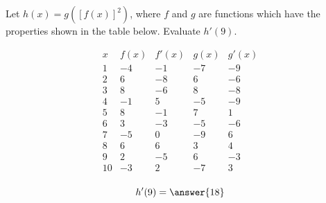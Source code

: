 \documentclass{ximera}
\author{Steven Gubkin}
\begin{document}
\begin{exercise}

Let $h(x) = g(\left[f(x)\right]^2)$, where $f$ and $g$ are functions which have the properties shown in the table below.  Evaluate $h'(9)$.

\[
\begin{array}{c|c|c|c|c}
 x & f(x) & f'(x) & g(x) & g'(x)\\ \hline
1 & -4 & -1 & -7 & -9\\
2 & 6 & -8 & 6 & -6\\
3 & 8 & -6 & 8 & -8\\
4 & -1 & 5 & -5 & -9\\
5 & 8 & -1 & 7 & 1\\
6 & 3 & -3 & -5 & -6\\
7 & -5 & 0 & -9 & 6\\
8 & 6 & 6 & 3 & 4\\
9 & 2 & -5 & 6 & -3\\
10 & -3 & 2 & -7 & 3\\
\end{array}
\]


\begin{prompt}
	$$h'(9) = \answer{18}$$
\end{prompt}


\end{exercise}
\end{document}
